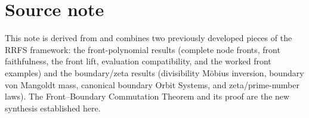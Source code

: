 \documentclass[11pt]{article}
\begin{document}
\section*{Source note}

This note is derived from and combines two previously developed pieces of the RRFS framework: the front-polynomial results (complete node fronts, front faithfulness, the front lift, evaluation compatibility, and the worked front examples) and the boundary/zeta results (divisibility M\"obius inversion, boundary von Mangoldt mass, canonical boundary Orbit Systems, and zeta/prime-number laws). The Front--Boundary Commutation Theorem and its proof are the new synthesis established here.
\end{document}
